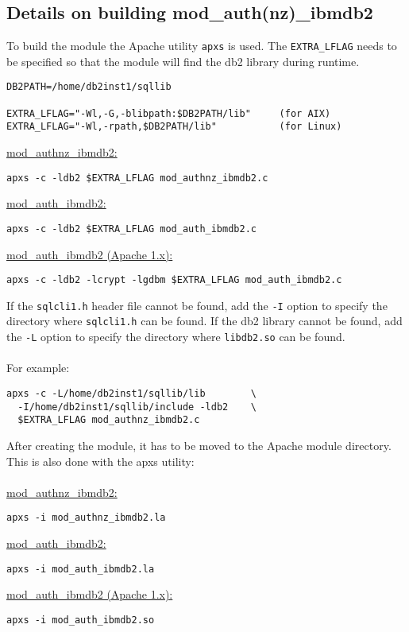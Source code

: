 \documentclass[11pt,letterpaper]{article}
\begin{document}
\subsection{Details on building mod\_auth(nz)\_ibmdb2}
To build the module the Apache utility {\tt apxs} is used. The {\tt EXTRA\_LFLAG} needs to be specified so that the module will find the db2 library during runtime.
\begin{verbatim}
DB2PATH=/home/db2inst1/sqllib

EXTRA_LFLAG="-Wl,-G,-blibpath:$DB2PATH/lib"     (for AIX)
EXTRA_LFLAG="-Wl,-rpath,$DB2PATH/lib"           (for Linux)
\end{verbatim}
\underline{mod\_authnz\_ibmdb2:}
\begin{verbatim}
apxs -c -ldb2 $EXTRA_LFLAG mod_authnz_ibmdb2.c
\end{verbatim}
\underline{mod\_auth\_ibmdb2:}
\begin{verbatim}
apxs -c -ldb2 $EXTRA_LFLAG mod_auth_ibmdb2.c
\end{verbatim}
\underline{mod\_auth\_ibmdb2 (Apache 1.x):}
\begin{verbatim}
apxs -c -ldb2 -lcrypt -lgdbm $EXTRA_LFLAG mod_auth_ibmdb2.c
\end{verbatim}
If the {\tt sqlcli1.h} header file cannot be found, add the {\tt -I} option to specify the
directory where {\tt sqlcli1.h} can be found.
If the db2 library cannot be found, add the {\tt -L} option to specify the
directory where {\tt libdb2.so} can be found.\\
\\
For example:
\begin{verbatim}
apxs -c -L/home/db2inst1/sqllib/lib        \
  -I/home/db2inst1/sqllib/include -ldb2    \
  $EXTRA_LFLAG mod_authnz_ibmdb2.c
\end{verbatim}
After creating the module, it has to be moved to the Apache module directory. This is also done with the apxs utility:\\
\\
\underline{mod\_authnz\_ibmdb2:}
\begin{verbatim}
apxs -i mod_authnz_ibmdb2.la
\end{verbatim}
\underline{mod\_auth\_ibmdb2:}
\begin{verbatim}
apxs -i mod_auth_ibmdb2.la
\end{verbatim}
\underline{mod\_auth\_ibmdb2 (Apache 1.x):}
\begin{verbatim}
apxs -i mod_auth_ibmdb2.so
\end{verbatim}
\end{document}
